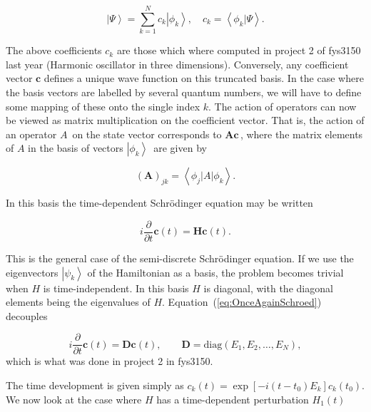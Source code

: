 \documentclass[10pt]{revtex4}
\begin{document}
\begin{equation}
	\left| \Psi \right\rangle = \sum^N_{k=1} c_k \left| \phi_k \right\rangle, \quad c_k = \left\langle \phi_k | \Psi \right\rangle.
\end{equation}

The above coefficients $c_k$ are those which where computed in project 2 of fys3150 last year (Harmonic oscillator in three dimensions).
Conversely, any coefficient vector $\mathbf{c}$ defines a unique wave function on this truncated basis. In the case where the basis vectors are labelled by several quantum numbers, we will have to define some mapping of these onto the single index $k$.  The action of operators can now be viewed as matrix multiplication on the coefficient vector. That is, the action of an operator $A\,$ on the state vector corresponds to $\mathbf{A} \mathbf{c}\,$, where the matrix elements of $A$ in the basis of vectors $\left| \phi_k \right\rangle\,$ are given by

\begin{equation}
	\left(\mathbf{A}\right)_{jk} = \left\langle \phi_j  | A | \phi_k \right\rangle.
\end{equation}

In this basis the time-dependent Schr\"odinger equation may be written

\begin{equation}
	i \frac{\partial}{\partial t} \mathbf{c} \left(t\right)= \mathbf{H} \mathbf{c} \left(t\right).
	\label{eq:OnceAgainSchroed}
\end{equation}

This is the general case of the semi-discrete Schr\"odinger equation. 
If we use the eigenvectors $\left|\psi_k\right\rangle$ of the Hamiltonian as a basis, the problem becomes trivial when $H$ is time-independent. In this basis $H$ is diagonal, with the diagonal elements being the eigenvalues of $H$. Equation~(\ref{eq:OnceAgainSchroed}) decouples

\begin{equation}
	i \frac{\partial}{\partial t} \mathbf{c} \left(t\right)= \mathbf{D} \mathbf{c} \left(t\right), \qquad \mathbf{D} 
	= \mathrm{diag} \left( E_1, E_2, \ldots, E_N \right),
\end{equation}
which is what was done in project 2 in fys3150.

The time development is given simply as $c_k\left(t\right)=\exp \left[ -i(t-t_0)E_k \right] c_k \left( t_0 \right)$. We now look at the case where $H$ has a time-dependent perturbation $H_1\left(t\right)$
\end{document}
